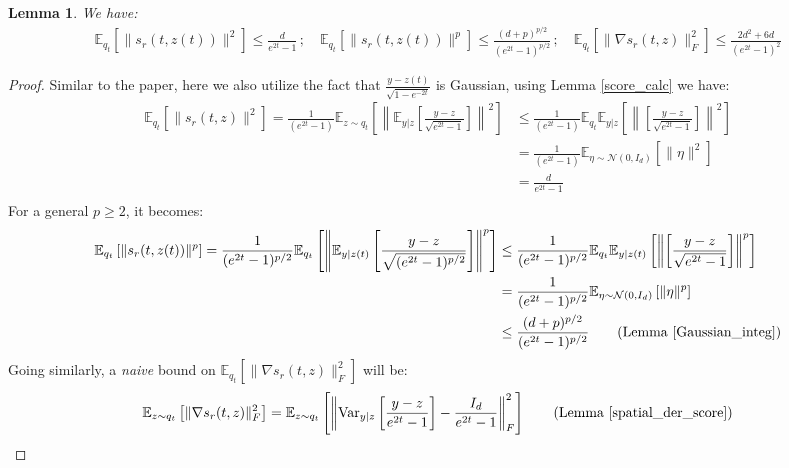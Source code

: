 \documentclass{article}
\newtheorem{lemma}{Lemma}[section]
\begin{document}
\begin{lemma}
\label{score_bound}
    We have:
    \begin{align*}
        \mathbb{E}_{q_t}\left[\|s_r(t,z(t))\|^2\right] \leq \frac{d}{e^{2t}-1} \, ; \quad  \mathbb{E}_{q_t}\left[\|s_r(t,z(t))\|^p\right]\leq \frac{(d+p)^{p/2}}{(e^{2t}-1)^{p/2}} \, ; \quad \mathbb{E}_{q_t}\left[\|\nabla s_r(t,z)\|^2_F\right] \leq \frac{2d^2+6d}{(e^{2t}-1)^2}
    \end{align*}
\end{lemma}
\begin{proof}
    Similar to the \cite{chen2023improved} paper, here we also utilize the fact that $\frac{y-z(t)}{\sqrt{1-e^{-2t}}}$ is Gaussian, using Lemma \ref{score_calc} we have:
    \begin{align*}
        \mathbb{E}_{q_t}\left[\|s_r(t,z)\|^2\right] = \frac{1}{(e^{2t}-1)}\mathbb{E}_{z\sim q_t}\left[\left\|\mathbb{E}_{y|z}\left[\frac{y-z}{\sqrt{e^{2t}-1}}\right]\right\|^2\right] &\leq \frac{1}{(e^{2t}-1)}\mathbb{E}_{q_t}\mathbb{E}_{y|z}\left[\left\|\left[\frac{y-z}{\sqrt{e^{2t}-1}}\right]\right\|^2\right] \\
        &= \frac{1}{(e^{2t}-1)}\mathbb{E}_{\eta \sim \mathcal{N}(0,I_d)}\left[\|\eta\|^2\right]\\
        &= \frac{d}{e^{2t}-1}\\
    \end{align*}
    \noindent
    For a general $p\geq 2$, it becomes:
     \begin{align*}
        \mathbb{E}_{q_t}\left[\|s_r(t,z(t))\|^p\right] = \frac{1}{(e^{2t}-1)^{p/2}}\mathbb{E}_{q_t}\left[\left\|\mathbb{E}_{y|z(t)}\left[\frac{y-z}{\sqrt{(e^{2t}-1)^{p/2}}}\right]\right\|^p\right] &\leq \frac{1}{(e^{2t}-1)^{p/2}}\mathbb{E}_{q_t}\mathbb{E}_{y|z(t)}\left[\left\|\left[\frac{y-z}{\sqrt{e^{2t}-1}}\right]\right\|^p\right] \\
        &= \frac{1}{(e^{2t}-1)^{p/2}}\mathbb{E}_{\eta \sim \mathcal{N}(0,I_d)}\left[\|\eta\|^p\right]\\
        &\leq \frac{(d+p)^{p/2}}{(e^{2t}-1)^{p/2}} \tag{Lemma \ref{Gaussian_integ}}\\
    \end{align*}
    Going similarly, a \textit{naive} bound on $\mathbb{E}_{q_t}\left[\|\nabla s_r(t,z)\|^2_F\right]$ will be:
    \begin{align*}
        \mathbb{E}_{z\sim q_t}\left[\|\nabla s_r(t,z)\|^2_F\right] &= \mathbb{E}_{z\sim q_t}\left[\left\|\text{Var}_{y|z}\left[\frac{y-z}{e^{2t}-1}\right] - \frac{I_d}{e^{2t}-1}\right\|^2_F\right] \tag{Lemma \ref{spatial_der_score}} \\

\end{align*}
\end{proof}
\end{document}
